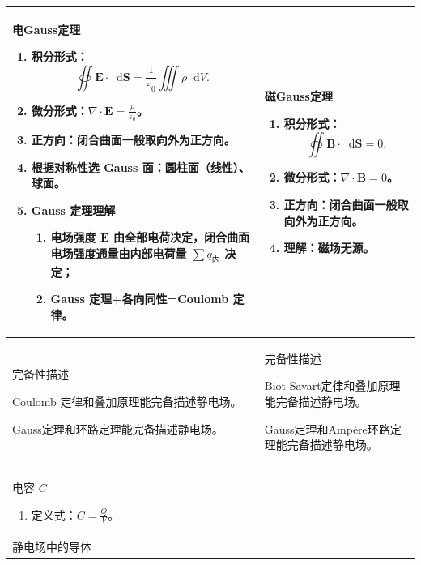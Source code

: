 \documentclass[UTF8,fontset=fandol,zihao=5]{ctexart}
\newcommand{\vect}[1]{\bm{#1}}
\newcommand{\dif}{\mathop{}\!\mathrm{d}}
\begin{document}
\begin{longtable}{|>{\raggedright\arraybackslash}p{}|>{\raggedright\arraybackslash}p{}|}
\centering 电Gauss定理
\begin{enumerate}
  \item 积分形式：
  \[
    \oiint\vect E\cdot\dif\vect S=\frac{1}{\varepsilon_0}\iiint\rho\dif V.
  \]
  \item 微分形式：\(\displaystyle\nabla\cdot\vect E=\frac{\rho}{\varepsilon_0}\)。
  \item 正方向：闭合曲面一般取向外为正方向。
  \item 根据对称性选 Gauss 面：圆柱面（线性）、球面。
  \item Gauss 定理理解
  \begin{enumerate}
    \item 电场强度 \(\vect E\) 由全部电荷决定，闭合曲面电场强度通量由内部电荷量 \(\sum q_{\text{内}}\) 决定；
    \item Gauss 定理+各向同性=Coulomb 定律。
  \end{enumerate}
\end{enumerate}
& \centering\arraybackslash 磁Gauss定理
\begin{enumerate}
  \item 积分形式：
  \[
    \oiint\vect B\cdot\dif\vect S=0.
  \]
  \item 微分形式：\(\displaystyle\nabla\cdot\vect B=0\)。
  \item 正方向：闭合曲面一般取向外为正方向。
  \item 理解：磁场无源。
\end{enumerate}
\\ \hline

\centering 完备性描述

Coulomb 定律和叠加原理能完备描述静电场。

Gauss定理和环路定理能完备描述静电场。

& \centering\arraybackslash 完备性描述

Biot-Savart定律和叠加原理能完备描述静电场。

Gauss定理和Ampère环路定理能完备描述静电场。

\\ \hline

\centering 电容 \(C\)
\begin{enumerate}
  \item 定义式：\(\displaystyle C=\frac{Q}{V}\)。
\end{enumerate}
\vspace{0.8em}
& \\ \hline

\centering 静电场中的导体


\end{longtable}
\end{document}
